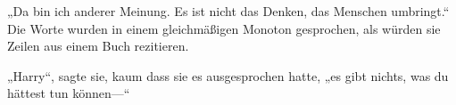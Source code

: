 „Da bin ich anderer Meinung. Es ist nicht das Denken, das Menschen umbringt.“ Die Worte wurden in einem gleichmäßigen Monoton gesprochen, als würden sie Zeilen aus einem Buch rezitieren.

„Harry“, sagte sie, kaum dass sie es ausgesprochen hatte, „es gibt nichts, was du hättest tun können—“



